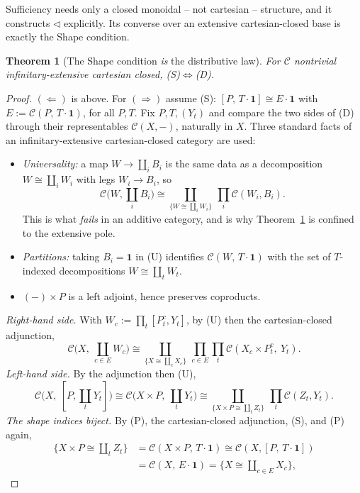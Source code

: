 \documentclass[11pt]{amsart}
\theoremstyle{plain}
\newtheorem{theorem}{Theorem}[section]
\theoremstyle{definition}
\newcommand{\C}{\mathcal{C}}
\newcommand{\comp}{\mathbin{\triangleleft}}
\newcommand{\one}{\mathbf{1}}
\begin{document}
Sufficiency needs only a closed monoidal -- not cartesian -- structure, and it constructs $\comp$
explicitly. Its converse over an extensive cartesian-closed base is exactly the Shape condition.

\begin{theorem}[The Shape condition \emph{is} the distributive law]\label{thm:char}
For $\C$ nontrivial infinitary-extensive cartesian closed, \emph{(S)}$\iff$\emph{(D)}.
\end{theorem}
\begin{proof}
$(\Leftarrow)$ is above. For $(\Rightarrow)$ assume (S): $[P,\,T\cdot\one]\cong E\cdot\one$ with
$E:=\C(P,\,T\cdot\one)$, for all $P,T$. Fix $P,T,(Y_t)$ and compare the two sides of (D) through their
representables $\C(X,-)$, naturally in $X$. Three standard facts of an infinitary-extensive
cartesian-closed category are used:
\begin{itemize}[leftmargin=1.5em]
\item[(U)] \emph{Universality:} a map $W\to\coprod_i B_i$ is the same data as a decomposition
$W\cong\coprod_i W_i$ with legs $W_i\to B_i$, so
\[
   \C\Big(W,\coprod_i B_i\Big)\cong\coprod_{\{W\cong\coprod_i W_i\}}\ \prod_i\C(W_i,B_i).
\]
This is what \emph{fails} in an additive category, and is why Theorem~\ref{thm:char} is confined to
the extensive pole.
\item[(P)] \emph{Partitions:} taking $B_i=\one$ in (U) identifies $\C(W,\,T\cdot\one)$ with the set of
$T$-indexed decompositions $W\cong\coprod_{t}W_t$.
\item[(Dist)] $(-)\times P$ is a left adjoint, hence preserves coproducts.
\end{itemize}
\emph{Right-hand side.} With $W_c:=\prod_t[P^c_t,Y_t]$, by (U) then the cartesian-closed adjunction,
\[
   \C\Big(X,\ \coprod_{c\in E}W_c\Big)\cong
   \coprod_{\{X\cong\coprod_{c}X_c\}}\ \prod_{c\in E}\prod_{t}\C(X_c\times P^c_t,\ Y_t).
\]
\emph{Left-hand side.} By the adjunction then (U),
\[
   \C\big(X,\ [P,\textstyle\coprod_t Y_t]\big)\cong\C\big(X\times P,\ \textstyle\coprod_t Y_t\big)\cong
   \coprod_{\{X\times P\cong\coprod_t Z_t\}}\ \prod_{t}\C(Z_t,Y_t).
\]
\emph{The shape indices biject.} By (P), the cartesian-closed adjunction, (S), and (P) again,
\[
\begin{aligned}
   \{X\times P\cong\textstyle\coprod_t Z_t\}
   &=\C(X\times P,\,T\cdot\one)\cong\C(X,[P,\,T\cdot\one])\\
   &=\C(X,\,E\cdot\one)=\{X\cong\textstyle\coprod_{c\in E}X_c\},
\end{aligned}
\]
\end{proof}
\end{document}
